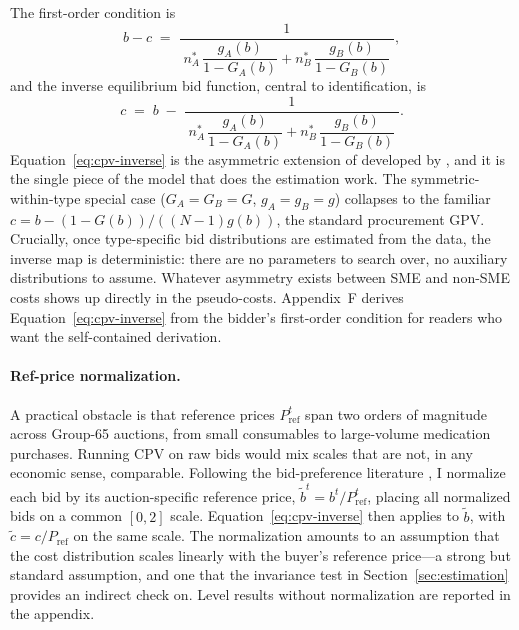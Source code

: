 \documentclass[12pt]{article}
\begin{document}
The first-order condition is
\begin{equation}
b - c \;=\; \frac{1}
  {\;n_A^* \, \dfrac{g_A(b)}{1-G_A(b)}
   + n_B^* \, \dfrac{g_B(b)}{1-G_B(b)}\;},
\label{eq:cpv-foc}
\end{equation}
and the inverse equilibrium bid function, central to identification, is
\begin{equation}
c \;=\; b \;-\; \frac{1}
  {\;n_A^* \, \dfrac{g_A(b)}{1-G_A(b)}
   + n_B^* \, \dfrac{g_B(b)}{1-G_B(b)}\;}.
\label{eq:cpv-inverse}
\end{equation}
Equation~\eqref{eq:cpv-inverse} is the asymmetric extension of
\citet{gpv2000} developed by \citet{campo2003}, and it is the
single piece of the model that does the estimation work. The
symmetric-within-type special case ($G_A = G_B = G$, $g_A = g_B =
g$) collapses to the familiar $c = b - (1 - G(b)) / ((N-1) g(b))$,
the standard procurement GPV. Crucially, once type-specific bid
distributions are estimated from the data, the inverse map is
deterministic: there are no parameters to search over, no auxiliary
distributions to assume. Whatever asymmetry exists between SME and
non-SME costs shows up directly in the pseudo-costs. Appendix~F
derives Equation~\eqref{eq:cpv-inverse} from the bidder's
first-order condition for readers who want the self-contained
derivation.

\paragraph{Ref-price normalization.}
A practical obstacle is that reference prices $P_{\text{ref}}^t$
span two orders of magnitude across Group-65 auctions, from small
consumables to large-volume medication purchases. Running CPV on
raw bids would mix scales that are not, in any economic sense,
comparable. Following the bid-preference literature
\citep[e.g.,][]{athey2013}, I normalize each bid by its
auction-specific reference price, $\tilde{b}^t = b^t /
P_{\text{ref}}^t$, placing all normalized bids on a common
$[0, 2]$ scale. Equation~\eqref{eq:cpv-inverse} then applies to
$\tilde{b}$, with $\tilde c = c / P_{\text{ref}}$ on the same
scale. The normalization amounts to an assumption that the cost
distribution scales linearly with the buyer's reference price---a
strong but standard assumption, and one that the invariance test
in Section~\ref{sec:estimation} provides an indirect check on.
Level results without normalization are reported in the appendix.

\end{document}
